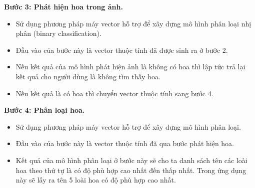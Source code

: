 \documentclass[12pt]{report}
\begin{document}
		\textbf{Bước 3: Phát hiện hoa trong ảnh.} 
		\begin{itemize}
			\item Sử dụng phương pháp máy vector hỗ trợ để xây dựng mô hình phân loại nhị phân (binary classification).
			\item Đầu vào của bước này là vector thuộc tính đã được sinh ra ở bước 2.
			\item Nếu kết quả của mô hình phát hiện ảnh là không có hoa thì lập tức trả lại kết quả cho người dùng là không tìm thấy hoa.
			\item Nếu kết quả là có hoa thì chuyển vector thuộc tính sang bước 4.
		\end{itemize}
														
														
		\textbf{Bước 4: Phân loại hoa.} 
		\begin{itemize}
			\item Sử dụng phương pháp máy vector hỗ trợ để xây dựng mô hình phân loại.
			\item Đầu vào của bước này là vector thuộc tính đã qua bước phát hiện hoa.
			\item Kết quả của mô hình phân loại ở bước này sẽ cho ta danh sách tên các loài hoa theo thứ tự là có độ phù hợp cao nhất đến thấp nhất. Trong ứng dụng này sẽ lấy ra tên 5 loài hoa có độ phù hợp cao nhất.
		\end{itemize}
														
\end{document}
